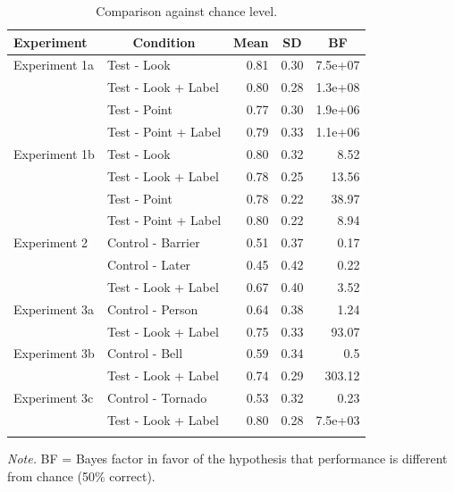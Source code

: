 \documentclass[
  man,floatsintext]{apa6}
\begin{document}
\begin{table}[tbp]

\begin{center}
\begin{threeparttable}

\caption{\label{tab:tab1}Comparison against chance level.}

\begin{tabular}{llrrr}
\toprule
Experiment & \multicolumn{1}{c}{Condition} & \multicolumn{1}{c}{Mean} & \multicolumn{1}{c}{SD} & \multicolumn{1}{c}{BF}\\
\midrule
Experiment 1a & Test - Look & 0.81 & 0.30 & 7.5e+07\\
 & Test - Look + Label & 0.80 & 0.28 & 1.3e+08\\
 & Test - Point & 0.77 & 0.30 & 1.9e+06\\
 & Test - Point + Label & 0.79 & 0.33 & 1.1e+06\\
Experiment 1b & Test - Look & 0.80 & 0.32 & 8.52\\
 & Test - Look + Label & 0.78 & 0.25 & 13.56\\
 & Test - Point & 0.78 & 0.22 & 38.97\\
 & Test - Point + Label & 0.80 & 0.22 & 8.94\\
Experiment 2 & Control - Barrier & 0.51 & 0.37 & 0.17\\
 & Control - Later & 0.45 & 0.42 & 0.22\\
 & Test - Look + Label & 0.67 & 0.40 & 3.52\\
Experiment 3a & Control - Person & 0.64 & 0.38 & 1.24\\
 & Test - Look + Label & 0.75 & 0.33 & 93.07\\
Experiment 3b & Control - Bell & 0.59 & 0.34 & 0.5\\
 & Test - Look + Label & 0.74 & 0.29 & 303.12\\
Experiment 3c & Control - Tornado & 0.53 & 0.32 & 0.23\\
 & Test - Look + Label & 0.80 & 0.28 & 7.5e+03\\
\bottomrule
\addlinespace
\end{tabular}

\begin{tablenotes}[para]
\normalsize{\textit{Note.} BF = Bayes factor in favor of the hypothesis that performance is different from chance (50\% correct).}
\end{tablenotes}

\end{threeparttable}
\end{center}

\end{table}
\end{document}
